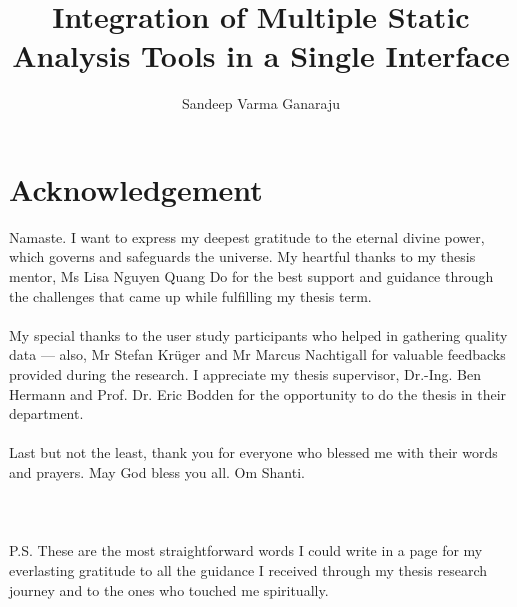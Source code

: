 \documentclass[]{upb_cs_thesis} %
\title{Integration of Multiple Static Analysis Tools in a Single Interface}
\author{Sandeep Varma Ganaraju}
\begin{document}
\let\cleardoublepage\clearpage
\clearpage

\chapter*{Acknowledgement}


\vspace*{\fill}
Namaste. I want to express my deepest gratitude to the eternal divine power, which governs and safeguards the universe. My heartful thanks to my thesis mentor, Ms Lisa Nguyen Quang Do for the best support and guidance through the challenges that came up while fulfilling my thesis term. \\ \\

My special thanks to the user study participants who helped in gathering quality data — also, Mr Stefan Krüger and Mr Marcus Nachtigall for valuable feedbacks provided during the research. I appreciate my thesis supervisor, Dr.-Ing. Ben Hermann and Prof. Dr. Eric Bodden for the opportunity to do the thesis in their department. \\ \\

Last but not the least, thank you for everyone who blessed me with their words and prayers. May God bless you all. Om Shanti. \\ \\ \\ \\

\noindent P.S. These are the most straightforward words I could write in a page for my everlasting gratitude to all the guidance I received through my thesis research journey and to the ones who touched me spiritually.
\vspace*{\fill}
%

\clearpage

\vspace*{\fill}
\begin{abstract}
	
\end{abstract}
\acresetall
\vspace*{\fill}
\let\cleardoublepage\clearpage

\tableofcontents %



\end{document}
